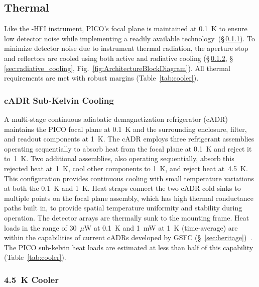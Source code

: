 \subsection{Thermal}
\label{sec:thermal} %

Like the \planck -HFI instrument, PICO's focal plane is maintained at 0.1~K to ensure low detector noise while implementing a readily available technology~(\S\,\ref{sec:cadr}). To minimize detector noise due to instrument thermal radiation, the aperture stop and reflectors are cooled using both active and radiative cooling (\S\,\ref{sec:4kcooler}, \S\,\ref{sec:radiative_cooling}, Fig.~\ref{fig:ArchitectureBlockDiagram}).  All thermal requirements are met with robust margins (Table~\ref{tab:cooler}).



\subsubsection{cADR Sub-Kelvin Cooling}
\label{sec:cadr} %

A multi-stage continuous adiabatic demagnetization refrigerator (cADR) maintains the PICO focal plane at 0.1~K and the surrounding enclosure, filter, and readout components at 1~K. The cADR employs three refrigerant assemblies operating sequentially to absorb heat from the focal plane at 0.1~K and reject it to~1~K. Two additional assemblies, also operating sequentially, absorb this rejected heat at~1~K, cool other components to 1~K, and reject heat at~4.5~K. This configuration provides continuous cooling with small temperature variations at both the 0.1~K and 1~K. Heat straps connect the two cADR cold sinks to multiple points on the focal plane assembly,
which has high thermal conductance paths built in, to provide spatial temperature uniformity and stability during operation. The detector arrays are thermally sunk to the mounting frame.  Heat loads in the range of 30~$\mu$W at 0.1~K and 1~mW at 1~K (time-average) are within the capabilities of current cADRs developed by GSFC (\S~\ref{sec:heritage})~\citep{Shirron2012,Shirron2016}. The PICO sub-kelvin heat loads are estimated at less than half of this capability (Table~\ref{tab:cooler}).

\subsubsection{4.5~K Cooler}
\label{sec:4kcooler} %

